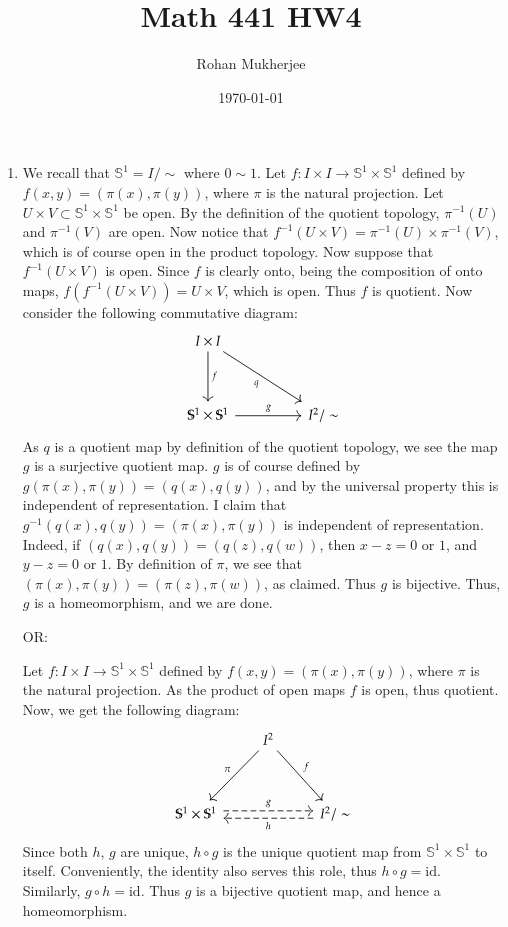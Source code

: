 \documentclass[12pt]{article}
\title{Math 441 HW4}
\date{\today}
\author{Rohan Mukherjee}
\theoremstyle{definitionstyle}
\def\mbb#1{\mathbb{#1}}
\renewcommand{\S}{\mbb{S}}
\begin{document}
	\maketitle
	\begin{enumerate}[leftmargin=\labelsep]
		\item We recall that $\S^1 = I / \sim$ where $0 \sim 1$. Let $f: I \times I \to \S^1 \times \S^1$ defined by $f(x,y) = (\pi(x), \pi(y))$, where $\pi$ is the natural projection. Let $U \times V \subset \S^1 \times \S^1$ be open. By the definition of the quotient topology, $\pi^{-1}(U)$ and $\pi^{-1}(V)$ are open. Now notice that $f^{-1}(U \times V) = \pi^{-1}(U) \times \pi^{-1}(V)$, which is of course open in the product topology. Now suppose that $f^{-1}(U \times V)$ is open. Since $f$ is clearly onto, being the composition of onto maps, $f(f^{-1}(U \times V)) = U \times V$, which is open. Thus $f$ is quotient. Now consider the following commutative diagram:
		\[\begin{tikzcd}
			{I \times I} \\
			\\
			{\S^1 \times \S^1} && {I^2/\sim}
			\arrow["f", from=1-1, to=3-1]
			\arrow["g", from=3-1, to=3-3]
			\arrow["q"', from=1-1, to=3-3]
		\end{tikzcd}\]
		As $q$ is a quotient map by definition of the quotient topology, we see the map $g$ is a surjective quotient map. $g$ is of course defined by $g(\pi(x), \pi(y)) = (q(x), q(y))$, and by the universal property this is independent of representation. I claim that $g^{-1}(q(x), q(y)) = (\pi(x), \pi(y))$ is independent of representation. Indeed, if $(q(x), q(y)) = (q(z), q(w))$, then $x-z = 0$ or $1$, and $y-z = 0$ or $1$. By definition of $\pi$, we see that $(\pi(x), \pi(y)) = (\pi(z), \pi(w))$, as claimed. Thus $g$ is bijective. Thus, $g$ is a homeomorphism, and we are done.
		
		OR:
		
		Let $f: I \times I \to \S^1 \times \S^1$ defined by $f(x,y) = (\pi(x), \pi(y))$, where $\pi$ is the natural projection. As the product of open maps $f$ is open, thus quotient. Now, we get the following diagram:
		\[\begin{tikzcd}
			& {I^2} \\
			\\
			{\S^1 \times \S^1} && {I^2/\sim}
			\arrow["g", shift left=1, dashed, from=3-1, to=3-3]
			\arrow["h", shift left=1, dashed, from=3-3, to=3-1]
			\arrow["f", from=1-2, to=3-3]
			\arrow["\pi"', from=1-2, to=3-1]
		\end{tikzcd}\]
		Since both $h$, $g$ are unique, $h \circ g$ is the unique quotient map from $\S^1 \times \S^1$ to itself. Conveniently, the identity also serves this role, thus $h \circ g = \mathrm{id}$. Similarly, $g \circ h = \mathrm{id}$. Thus $g$ is a bijective quotient map, and hence a homeomorphism.
		

\end{enumerate}
\end{document}

